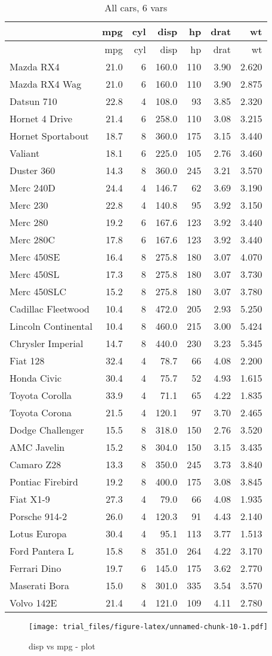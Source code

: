 \documentclass[]{article}
\begin{document}
\begin{longtable}[]{@{}lrrrrrr@{}}
\caption{All cars, 6 vars}\tabularnewline
\toprule
& mpg & cyl & disp & hp & drat & wt\tabularnewline
\midrule
\endfirsthead
\toprule
& mpg & cyl & disp & hp & drat & wt\tabularnewline
\midrule
\endhead
Mazda RX4 & 21.0 & 6 & 160.0 & 110 & 3.90 & 2.620\tabularnewline
Mazda RX4 Wag & 21.0 & 6 & 160.0 & 110 & 3.90 & 2.875\tabularnewline
Datsun 710 & 22.8 & 4 & 108.0 & 93 & 3.85 & 2.320\tabularnewline
Hornet 4 Drive & 21.4 & 6 & 258.0 & 110 & 3.08 & 3.215\tabularnewline
Hornet Sportabout & 18.7 & 8 & 360.0 & 175 & 3.15 & 3.440\tabularnewline
Valiant & 18.1 & 6 & 225.0 & 105 & 2.76 & 3.460\tabularnewline
Duster 360 & 14.3 & 8 & 360.0 & 245 & 3.21 & 3.570\tabularnewline
Merc 240D & 24.4 & 4 & 146.7 & 62 & 3.69 & 3.190\tabularnewline
Merc 230 & 22.8 & 4 & 140.8 & 95 & 3.92 & 3.150\tabularnewline
Merc 280 & 19.2 & 6 & 167.6 & 123 & 3.92 & 3.440\tabularnewline
Merc 280C & 17.8 & 6 & 167.6 & 123 & 3.92 & 3.440\tabularnewline
Merc 450SE & 16.4 & 8 & 275.8 & 180 & 3.07 & 4.070\tabularnewline
Merc 450SL & 17.3 & 8 & 275.8 & 180 & 3.07 & 3.730\tabularnewline
Merc 450SLC & 15.2 & 8 & 275.8 & 180 & 3.07 & 3.780\tabularnewline
Cadillac Fleetwood & 10.4 & 8 & 472.0 & 205 & 2.93 &
5.250\tabularnewline
Lincoln Continental & 10.4 & 8 & 460.0 & 215 & 3.00 &
5.424\tabularnewline
Chrysler Imperial & 14.7 & 8 & 440.0 & 230 & 3.23 & 5.345\tabularnewline
Fiat 128 & 32.4 & 4 & 78.7 & 66 & 4.08 & 2.200\tabularnewline
Honda Civic & 30.4 & 4 & 75.7 & 52 & 4.93 & 1.615\tabularnewline
Toyota Corolla & 33.9 & 4 & 71.1 & 65 & 4.22 & 1.835\tabularnewline
Toyota Corona & 21.5 & 4 & 120.1 & 97 & 3.70 & 2.465\tabularnewline
Dodge Challenger & 15.5 & 8 & 318.0 & 150 & 2.76 & 3.520\tabularnewline
AMC Javelin & 15.2 & 8 & 304.0 & 150 & 3.15 & 3.435\tabularnewline
Camaro Z28 & 13.3 & 8 & 350.0 & 245 & 3.73 & 3.840\tabularnewline
Pontiac Firebird & 19.2 & 8 & 400.0 & 175 & 3.08 & 3.845\tabularnewline
Fiat X1-9 & 27.3 & 4 & 79.0 & 66 & 4.08 & 1.935\tabularnewline
Porsche 914-2 & 26.0 & 4 & 120.3 & 91 & 4.43 & 2.140\tabularnewline
Lotus Europa & 30.4 & 4 & 95.1 & 113 & 3.77 & 1.513\tabularnewline
Ford Pantera L & 15.8 & 8 & 351.0 & 264 & 4.22 & 3.170\tabularnewline
Ferrari Dino & 19.7 & 6 & 145.0 & 175 & 3.62 & 2.770\tabularnewline
Maserati Bora & 15.0 & 8 & 301.0 & 335 & 3.54 & 3.570\tabularnewline
Volvo 142E & 21.4 & 4 & 121.0 & 109 & 4.11 & 2.780\tabularnewline
\bottomrule
\end{longtable}

\begin{figure}[htbp]
\centering
\texttt{[image: trial\_files/figure-latex/unnamed-chunk-10-1.pdf]}
\caption{disp vs mpg - plot}
\end{figure}
\end{document}
